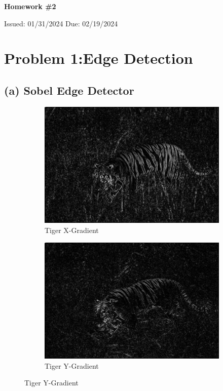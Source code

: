 \documentclass[12pt]{article}
\begin{document}
	
	\begin{center}
		\Large
		\textbf{Homework \#2}
		
		\vspace{0.2cm}
		\normalsize
		Issued: 01/31/2024 \hfill Due: 02/19/2024
	\end{center}

\section*{Problem 1:Edge Detection}
\subsection*{(a) Sobel Edge Detector}
\begin{figure}[H]
	\centering
	\begin{subfigure}{0.45\textwidth}
		\centering
		\includegraphics[width=\textwidth]{TigerX.jpg}
		\caption{Tiger X-Gradient}
		\label{fig:tiger.x}
	\end{subfigure}
	\begin{subfigure}{0.45\textwidth}
		\centering
		\includegraphics[width=\textwidth]{TigerY.jpg}
		\caption{Tiger Y-Gradient}
		\label{fig:tiger.y}
	\end{subfigure}
	

\end{figure}
\end{document}

